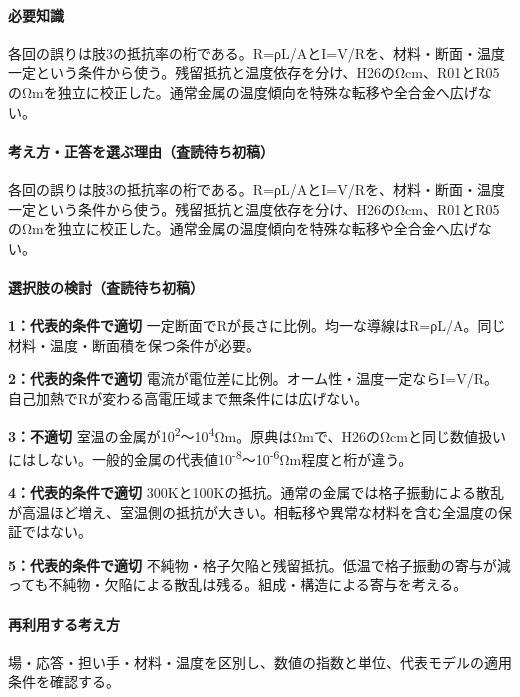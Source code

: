 \paragraph{必要知識} 各回の誤りは肢3の抵抗率の桁である。R=ρL/AとI=\allowbreak{}V/Rを、材料・断面・温度一定という条件から使う。残留抵抗と温度依存を分け、H26のΩcm、R01とR05のΩmを独立に校正した。通常金属の温度傾向を特殊な転移や全合金へ広げない。

\paragraph{考え方・正答を選ぶ理由（査読待ち初稿）} 各回の誤りは肢3の抵抗率の桁である。R=ρL/AとI=\allowbreak{}V/Rを、材料・断面・温度一定という条件から使う。残留抵抗と温度依存を分け、H26のΩcm、R01とR05のΩmを独立に校正した。通常金属の温度傾向を特殊な転移や全合金へ広げない。

\paragraph{選択肢の検討（査読待ち初稿）}\mbox{}\par

\noindent\textbf{1：代表的条件で適切} 一定断面でRが長さに比例。均一な導線はR=ρL/A。同じ材料・温度・断面積を保つ条件が必要。\par

\noindent\textbf{2：代表的条件で適切} 電流が電位差に比例。オーム性・温度一定ならI=\allowbreak{}V/R。自己加熱でRが変わる高電圧域まで無条件には広げない。\par

\noindent\textbf{3：不適切} 室温の金属が10\textsuperscript{2}〜10\textsuperscript{4}Ωm。原典はΩmで、H26のΩcmと同じ数値扱いにはしない。一般的金属の代表値10\textsuperscript{-8}〜10\textsuperscript{-6}Ωm程度と桁が違う。\par

\noindent\textbf{4：代表的条件で適切} 300Kと100Kの抵抗。通常の金属では格子振動による散乱が高温ほど増え、室温側の抵抗が大きい。相転移や異常な材料を含む全温度の保証ではない。\par

\noindent\textbf{5：代表的条件で適切} 不純物・格子欠陥と残留抵抗。低温で格子振動の寄与が減っても不純物・欠陥による散乱は残る。組成・構造による寄与を考える。\par

\paragraph{再利用する考え方} 場・応答・担い手・材料・温度を区別し、数値の指数と単位、代表モデルの適用条件を確認する。

